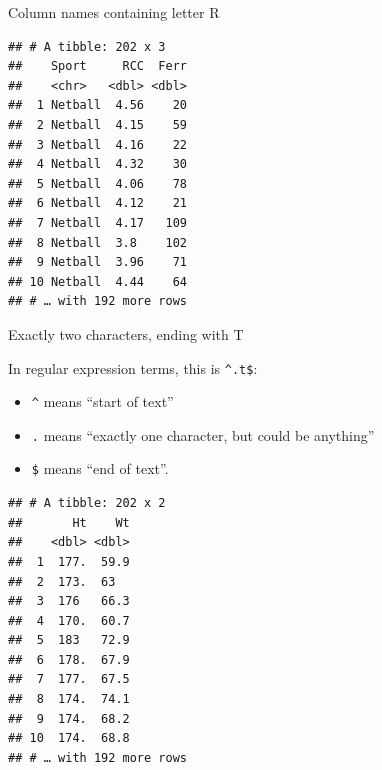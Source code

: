\documentclass[
  ignorenonframetext,
]{beamer}
\newenvironment{Shaded}{\begin{snugshade}}{\end{snugshade}}
\newcommand{\KeywordTok}[1]{\textcolor[rgb]{0.13,0.29,0.53}{\textbf{#1}}}
\newcommand{\NormalTok}[1]{#1}
\newcommand{\OperatorTok}[1]{\textcolor[rgb]{0.81,0.36,0.00}{\textbf{#1}}}
\newcommand{\StringTok}[1]{\textcolor[rgb]{0.31,0.60,0.02}{#1}}
\providecommand{\tightlist}{%
  \setlength{\itemsep}{0pt}\setlength{\parskip}{0pt}}
\begin{document}
\begin{frame}[fragile]{Column names containing letter R}
\protect\hypertarget{column-names-containing-letter-r}{}

\begin{Shaded}
\end{Shaded}

\begin{verbatim}
## # A tibble: 202 x 3
##    Sport     RCC  Ferr
##    <chr>   <dbl> <dbl>
##  1 Netball  4.56    20
##  2 Netball  4.15    59
##  3 Netball  4.16    22
##  4 Netball  4.32    30
##  5 Netball  4.06    78
##  6 Netball  4.12    21
##  7 Netball  4.17   109
##  8 Netball  3.8    102
##  9 Netball  3.96    71
## 10 Netball  4.44    64
## # … with 192 more rows
\end{verbatim}

\end{frame}

\begin{frame}[fragile]{Exactly two characters, ending with T}
\protect\hypertarget{exactly-two-characters-ending-with-t}{}

In regular expression terms, this is \texttt{\^{}.t\$}:

\begin{itemize}
\tightlist
\item
  \texttt{\^{}} means ``start of text''
\item
  \texttt{.} means ``exactly one character, but could be anything''
\item
  \texttt{\$} means ``end of text''.
\end{itemize}

\begin{Shaded}
\end{Shaded}

\begin{verbatim}
## # A tibble: 202 x 2
##       Ht    Wt
##    <dbl> <dbl>
##  1  177.  59.9
##  2  173.  63  
##  3  176   66.3
##  4  170.  60.7
##  5  183   72.9
##  6  178.  67.9
##  7  177.  67.5
##  8  174.  74.1
##  9  174.  68.2
## 10  174.  68.8
## # … with 192 more rows
\end{verbatim}

\end{frame}
\end{document}

